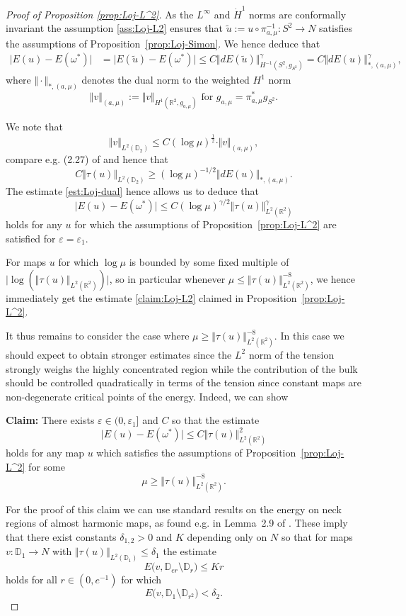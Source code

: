 \documentclass[10pt,reqno]{amsart}
\theoremstyle{plain}
\theoremstyle{definition}
\numberwithin{equation}{section}
\newcommand{\ga}{\gamma}
\newcommand{\de}{\delta}
\newcommand{\om}{\omega}
\newcommand{\D}{\mathbb{D}}
\newcommand{\R}{\ensuremath{{\mathbb R}}}
\newcommand{\norm}[1]{\Vert#1\Vert}
\newcommand{\beq}{\begin{equation}}
\newcommand{\eeq}{\end{equation}}
\newcommand{\beqs}{\begin{equation*}}
\newcommand{\eeqs}{\end{equation*}}
\newcommand{\beqa}{\begin{equation}\begin{aligned}}
\newcommand{\eeqa}{\end{aligned}\end{equation}}
\newcommand{\half}{\frac{1}{2}}
\newcommand{\abs}[1]{\vert#1\vert}
\newcommand{\eps}{\varepsilon}
\begin{document}
\begin{proof}[Proof of Proposition \ref{prop:Loj-L^2}]
As the $L^\infty$ and $\dot H^1$ norms are conformally invariant the assumption \eqref{ass:Loj-L2} ensures that  
$ \widetilde u:=u\circ \pi_{a,\mu}^{-1}:S^2\to N$
satisfies the assumptions of Proposition~\ref{prop:Loj-Simon}. We hence deduce that 
\beqa \label{est:Loj-dual}
\abs{E(u)-E(\om^*)}
&=
\abs{E(\widetilde u)-E(\om^*)}
\leq
C \norm{dE(\widetilde u)}_{H^{-1}(S^2, g_{S^2})}^\ga
=
C \norm{dE(u)}_{*,(a,\mu)}^\ga,
\eeqa
where $\norm{\cdot}_{*,(a,\mu)}$ denotes the dual norm to the weighted
$H^1$ norm
\beq \label{def:weighted-H1}
\norm{v}_{(a,\mu)}
:=
\norm{v}_{H^1(\R^2,g_{a,\mu})} \text{ for }
g_{a,\mu}
=
\pi_{a,\mu}^*g_{S^2}.
\eeq

We note that
\beqs
\norm{v}_{L^2(\D_2)}
\leq C
(\log\mu)^\half \cdot \norm{v}_{(a,\mu)},
\eeqs
compare e.g. (2.27) of \cite{rupflinharmonic} and hence that
\beqs
C\norm{\tau(u)}_{L^2(\D_2)}
\geq
(\log\mu)^{-1/2}\norm{dE(u)}_{*,(a,\mu)}. 
\eeqs
The estimate \eqref{est:Loj-dual} hence allows us to deduce that 
\beq \label{est:Loj-with-logmu}
\abs{E(u)-E(\om^*)}
\leq
C(\log\mu)^{\ga/2}
\norm{\tau(u)}_{L^2(\R^2)}^\ga
\eeq
holds 
for any $u$ for which the assumptions of  Proposition~\ref{prop:Loj-L^2} are satisfied for $\eps=\eps_1$.

For maps $u$ for which $\log \mu$ is bounded by some fixed multiple of $\abs{\log(\norm{\tau(u)}_{L^2(\R^2)})}$, so in particular whenever
$
\mu
\leq
\norm{\tau(u)}_{L^2(\R^2)}^{-8}
$, 
we hence immediately get the estimate \eqref{claim:Loj-L2} claimed
in Proposition~\ref{prop:Loj-L^2}.

It thus remains to consider the case where 
$\mu
\geq
\norm{\tau(u)}_{L^2(\R^2)}^{-8}$. In this case
 we should expect to obtain stronger estimates since the
$L^2$ norm of the tension strongly weighs the
highly concentrated region while the contribution of the bulk should be controlled quadratically in
terms of the tension since constant maps are
non-degenerate critical points of the energy.
Indeed, we can show


\textbf{Claim:}
There exists $\eps\in (0,\eps_1]$ and $C$ so that 
the  estimate 
\beqs
\abs{E(u)-E(\om^*)}
\leq
C\norm{\tau(u)}_{L^2(\R^2)}^2
\eeqs 
holds for any map $u$ which satisfies the assumptions
of Proposition~\ref{prop:Loj-L^2} for some 
\beq\label{ass:case2}
\mu \geq \norm{\tau(u)}_{L^2(\R^2)}^{-8}.
\eeq

For the proof of this claim we can use 
standard results on the energy
on neck regions of almost harmonic maps, as found e.g. in Lemma~2.9 of \cite{toppingannals}. These imply that there exist constants $\de_{1,2}>0$ and $K$ depending only on $N$ so that for maps $v:\D_1\to N$ with $\norm{\tau(u)}_{L^2(\D_1)}\leq\de_1 $ 
the estimate 
\beq
E\bigl(v,\D_{e r}\setminus \D_{r}\bigr)
\leq
K r
\label{est:neck-Peter}
\eeq 
holds for all $r\in(0,e^{-1})$ for which  
\beq\label{ass:E-small-neck}
E\bigl(v,\D_1\setminus \D_{r^2}\bigr)<\delta_2. 
\eeq




\end{proof}
\end{document}
